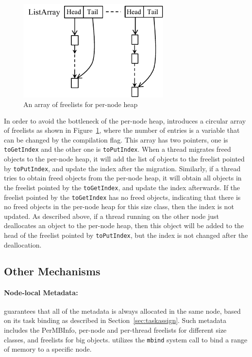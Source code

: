 \begin{figure}
\centering
\includegraphics[width=3in]{figure/listarray}
\vspace{-0.1in}
\caption{An array of freelists for per-node heap\label{fig:listarray}}
\vspace{-0.1in}
\end{figure}
In order to avoid the bottleneck of the per-node heap, \NM{} introduces a circular array of freelists as shown in Figure~\ref{fig:listarray}, where the number of entries is a variable that can be changed by the compilation flag. This array has two pointers, one is \texttt{toGetIndex} and the other one is \texttt{toPutIndex}. When a thread migrates freed objects to the per-node heap, it will add the list of objects to the freelist pointed by \texttt{toPutIndex}, and update the index after the migration. Similarly, if a thread tries to obtain freed objects from the per-node heap, it will obtain all objects in the freelist pointed by the \texttt{toGetIndex}, and update the index afterwards. If the freelist pointed by the \texttt{toGetIndex} has no freed objects, indicating that there is no freed objects in the per-node heap for this size class, then the index is not updated. As described above, if a thread running on the other node just deallocates an object to the per-node heap, then this object will be added to the head of the freelist pointed by  \texttt{toPutIndex}, but the index is not changed after the deallocation.  
 

\subsection{Other Mechanisms}

\paragraph{Node-local Metadata:} \NM{} guarantees that all of the metadata is always allocated in the same node, based on its task binding as described in Section~\ref{sec:taskassign}. Such metadata includes the PerMBInfo, per-node and per-thread freelists for different size classes, and freelists for big objects. \NM{} utilizes the \texttt{mbind} system call to bind a range of memory to a specific node.  

